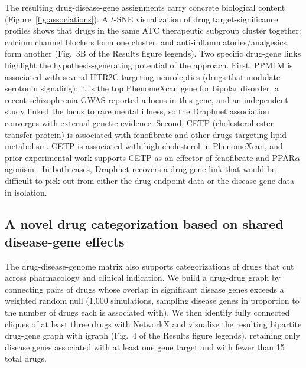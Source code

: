 \documentclass[11pt]{article}
\begin{document}
The resulting drug-disease-gene assignments carry concrete biological
content (Figure~\ref{fig:associations}). A $t$-SNE visualization of
drug target-significance profiles shows that drugs in the same ATC
therapeutic subgroup cluster together: calcium channel blockers form
one cluster, and anti-inflammatories/analgesics form another (Fig.~3B
of the Results figure legends). Two specific drug-gene links highlight
the hypothesis-generating potential of the approach. First, PPM1M is
associated with several HTR2C-targeting neuroleptics (drugs that
modulate serotonin signaling); it is the top PhenomeXcan gene for
bipolar disorder, a recent schizophrenia GWAS reported a locus in this
gene, and an independent study linked the locus to rare mental illness,
so the Draphnet association converges with external genetic evidence.
Second, CETP (cholesterol ester transfer protein) is associated with
fenofibrate and other drugs targeting lipid metabolism. CETP is
associated with high cholesterol in PhenomeXcan, and prior experimental
work supports CETP as an effector of fenofibrate and
PPAR$\alpha$ agonism \citep{huang2022perm1}. In both cases, Draphnet
recovers a drug-gene link that would be difficult to pick out from
either the drug-endpoint data or the disease-gene data in isolation.

\subsection{A novel drug categorization based on shared disease-gene
effects}

The drug-disease-genome matrix also supports categorizations of drugs
that cut across pharmacology and clinical indication. We build a
drug-drug graph by connecting pairs of drugs whose overlap in
significant disease genes exceeds a weighted random null (1,000
simulations, sampling disease genes in proportion to the number of
drugs each is associated with). We then identify fully connected
cliques of at least three drugs with NetworkX and visualize the
resulting bipartite drug-gene graph with igraph (Fig.~4 of the
Results figure legends), retaining only disease genes associated with
at least one gene target and with fewer than 15 total drugs.
\end{document}
